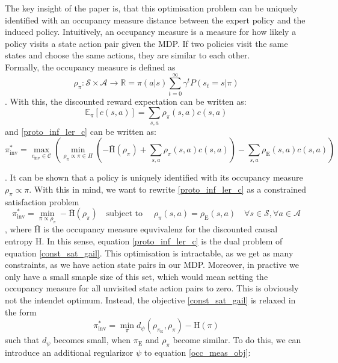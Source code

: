 The key insight of the paper is, that this optimisation problem can be uniquely identified with an occupancy measure distance between the expert policy and the 
induced policy. Intuitively, an occupancy measure is a measure for how likely a policy visits a state action pair given the MDP. If two policies visit the same 
states and choose the same actions, they are similar to each other.\\
Formally, the occupancy measure is defined as 
\begin{equation*}
    \rho_{\pi}:\mathcal{S} \times \mathcal{A} \rightarrow \mathbb{R} = \pi(a|s)\sum_{t=0}^\infty \gamma^tP(s_t=s|\pi)
\end{equation*}
. With this, the discounted reward expectation can be written as:
\begin{equation}
    \mathbb{E}_\pi[c(s,a)] = \sum_{s,a} \rho_\pi(s,a) c(s,a)
\end{equation}
and \ref{proto_inf_ler_c} can be written as:
\begin{equation}
    \label{occ_meas_obj}
    \pi_{\text{inv}}^* = \max_{c_{\text{inv}} \in \mathcal{C}} \left( \min_{\rho_\pi \propto \pi \in \Pi} \left(- \bar{\text{H}}(\rho_\pi) + \sum_{s,a} \rho_\pi(s,a) c(s,a) \right) - \sum_{s,a} \rho_{\text{E}}(s,a) c(s,a) \right)
\end{equation}

. It can be shown that a policy is uniquely identified with its occupancy measure $\rho_{\pi} \propto \pi$. With this in mind, we want to rewrite \ref{proto_inf_ler_c} as a constrained satisfaction problem
\begin{equation}
    \label{const_sat_gail}
    \pi_{\text{inv}}^* = \min_{\pi \propto \rho_{\pi}} - \bar{\text{H}}(\rho_{\pi})\quad \text{subject to }\quad \rho_{\pi}(s,a) = \rho_{\text{E}}(s,a) \quad \forall s \in \mathcal{S}, \forall a \in \mathcal{A}
\end{equation}
, where $\bar{\text{H}}$ is the occupancy measure equvivalenz for the discounted causal entropy $\text{H}$. In this sense, equation \ref{proto_inf_ler_c} is the dual problem of equation \ref{const_sat_gail}. 
This optimisation is intractable, as we get as many constraints, as we have action state pairs in our MDP. Moreover, in practive we only have a small smaple size of this set, which would mean setting 
the occupancy measure for all unvisited state action pairs to zero. This is obviously not the intendet optimum. Instead, the objective \ref{const_sat_gail} is relaxed in the form
\begin{equation}
    \label{dist_opt}
    \pi_{\text{inv}}^* = \min_{\pi} d_{\psi}(\rho_{\pi_{\text{E}}}, \rho_{\pi}) - \text{H}(\pi)
\end{equation}
such that $d_{\psi}$ becomes small, when $\pi_{\text{E}}$ and $\rho_{\pi}$ become similar. To do this, we can introduce an additional regularizor $\psi$ to equation \ref{occ_meas_obj}:

